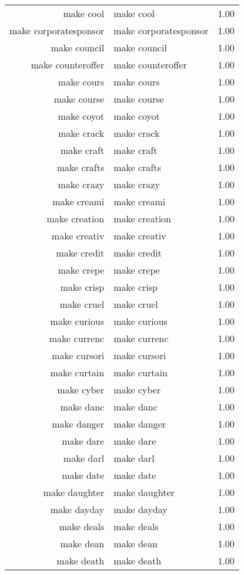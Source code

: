 \begin{table}[ht]
\begin{tabular}{rlr}
  make cool & make cool & 1.00 \\ 
  make corporatesponsor & make corporatesponsor & 1.00 \\ 
  make council & make council & 1.00 \\ 
  make counteroffer & make counteroffer & 1.00 \\ 
  make cours & make cours & 1.00 \\ 
  make course & make course & 1.00 \\ 
  make coyot & make coyot & 1.00 \\ 
  make crack & make crack & 1.00 \\ 
  make craft & make craft & 1.00 \\ 
  make crafts & make crafts & 1.00 \\ 
  make crazy & make crazy & 1.00 \\ 
  make creami & make creami & 1.00 \\ 
  make creation & make creation & 1.00 \\ 
  make creativ & make creativ & 1.00 \\ 
  make credit & make credit & 1.00 \\ 
  make crepe & make crepe & 1.00 \\ 
  make crisp & make crisp & 1.00 \\ 
  make cruel & make cruel & 1.00 \\ 
  make curious & make curious & 1.00 \\ 
  make currenc & make currenc & 1.00 \\ 
  make cursori & make cursori & 1.00 \\ 
  make curtain & make curtain & 1.00 \\ 
  make cyber & make cyber & 1.00 \\ 
  make danc & make danc & 1.00 \\ 
  make danger & make danger & 1.00 \\ 
  make dare & make dare & 1.00 \\ 
  make darl & make darl & 1.00 \\ 
  make date & make date & 1.00 \\ 
  make daughter & make daughter & 1.00 \\ 
  make dayday & make dayday & 1.00 \\ 
  make deals & make deals & 1.00 \\ 
  make dean & make dean & 1.00 \\ 
  make death & make death & 1.00 \\ 

\end{tabular}
\end{table}
